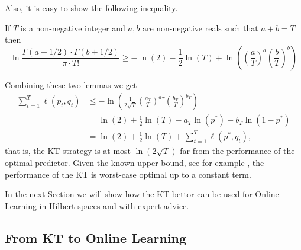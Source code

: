 Also, it is easy to show the following inequality.
\begin{lemma}
\label{lemma:approx_gamma}
If $T$ is a non-negative integer and $a,b$ are non-negative reals such that $a +
b = T$ then
$$
\ln \frac{\Gamma(a + 1/2) \cdot \Gamma(b + 1/2)}{\pi \cdot T!} 
\geq -\ln(2) -\frac{1}{2} \ln(T) +\ln \left(\left( \frac{a}{T} \right)^a \left( \frac{b}{T} \right)^b\right) 
$$
\end{lemma}

Combining these two lemmas we get
\begin{align*}
\sum_{t=1}^T \ell(p_t, q_t)
& \le - \ln \left( \frac{1}{2\sqrt{T}} \left( \frac{a_T}{T} \right)^{a_T} \left( \frac{b_T}{T} \right)^{b_T} \right) \\
& = \ln(2) + \frac{1}{2} \ln(T) - a_T \ln (p^*) - b_T \ln (1-p^*) \\
& = \ln(2) + \frac{1}{2} \ln(T) + \sum_{t=1}^T \ell(p^*, q_t),
\end{align*}
that is, the \ac{KT} strategy is at most $\ln(2\sqrt{T})$ far from the performance of the optimal predictor. Given the known upper bound, see for example \citet{Cesa-BianchiL06}, the performance of the \ac{KT} is worst-case optimal up to a constant term.

In the next Section we will show how the \ac{KT} bettor can be used for Online Learning in Hilbert spaces and with expert advice.


\subsection{From KT to Online Learning}


